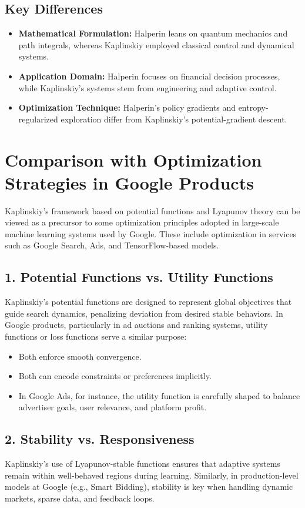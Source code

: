 \documentclass[12pt]{article}
\begin{document}
\subsection*{Key Differences}
\begin{itemize}
\item \textbf{Mathematical Formulation:} Halperin leans on quantum mechanics and path integrals, whereas Kaplinskiy employed classical control and dynamical systems.
\item \textbf{Application Domain:} Halperin focuses on financial decision processes, while Kaplinskiy's systems stem from engineering and adaptive control.
\item \textbf{Optimization Technique:} Halperin's policy gradients and entropy-regularized exploration differ from Kaplinskiy's potential-gradient descent.
\end{itemize}

\section{Comparison with Optimization Strategies in Google Products}
Kaplinskiy's framework based on potential functions and Lyapunov theory can be viewed as a precursor to some optimization principles adopted in large-scale machine learning systems used by Google. These include optimization in services such as Google Search, Ads, and TensorFlow-based models.

\subsection*{1. Potential Functions vs. Utility Functions}
Kaplinskiy's potential functions are designed to represent global objectives that guide search dynamics, penalizing deviation from desired stable behaviors. In Google products, particularly in ad auctions and ranking systems, utility functions or loss functions serve a similar purpose:
\begin{itemize}
\item Both enforce smooth convergence.
\item Both can encode constraints or preferences implicitly.
\item In Google Ads, for instance, the utility function is carefully shaped to balance advertiser goals, user relevance, and platform profit.
\end{itemize}

\subsection*{2. Stability vs. Responsiveness}
Kaplinskiy's use of Lyapunov-stable functions ensures that adaptive systems remain within well-behaved regions during learning. Similarly, in production-level models at Google (e.g., Smart Bidding), stability is key when handling dynamic markets, sparse data, and feedback loops.
\end{document}
